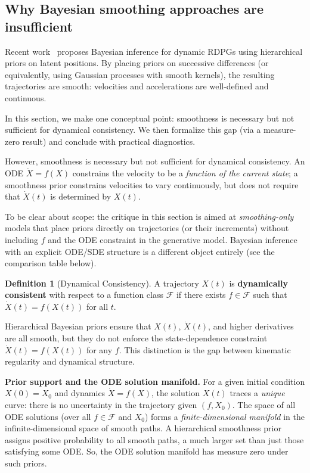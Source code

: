 \documentclass{article}
\theoremstyle{plain}
\theoremstyle{definition}
\newtheorem{definition}{Definition}
\theoremstyle{remark}
\begin{document}
\subsection{Why Bayesian smoothing approaches are insufficient}\label{sec:bayesian-smoothing}

Recent work~\citep{loyal2025} proposes Bayesian inference for dynamic RDPGs using hierarchical priors on latent positions.
By placing priors on successive differences (or equivalently, using Gaussian processes with smooth kernels), the resulting trajectories are smooth: velocities and accelerations are well-defined and continuous.

In this section, we make one conceptual point: smoothness is necessary but not sufficient for dynamical consistency. We then formalize this gap (via a measure-zero result) and conclude with practical diagnostics.

However, smoothness is necessary but not sufficient for dynamical consistency.
An ODE $\dot{X} = f(X)$ constrains the velocity to be a \emph{function of the current state}; a smoothness prior constrains velocities to vary continuously, but does not require that $\dot{X}(t)$ is determined by $X(t)$.

To be clear about scope: the critique in this section is aimed at \emph{smoothing-only} models that place priors directly on trajectories (or their increments) without including $f$ and the ODE constraint in the generative model. Bayesian inference with an explicit ODE/SDE structure is a different object entirely (see the comparison table below).

\begin{definition}[Dynamical Consistency]
A trajectory $X(t)$ is \textbf{dynamically consistent} with respect to a function class $\mathcal{F}$ if there exists $f \in \mathcal{F}$ such that $\dot{X}(t) = f(X(t))$ for all $t$.
\end{definition}

Hierarchical Bayesian priors ensure that $X(t)$, $\dot{X}(t)$, and higher derivatives are all smooth, but they do not enforce the state-dependence constraint $\dot{X}(t) = f(X(t))$ for any $f$.
This distinction is the gap between kinematic regularity and dynamical structure.

\textbf{Prior support and the ODE solution manifold.}
For a given initial condition $X(0) = X_0$ and dynamics $\dot{X} = f(X)$, the solution $X(t)$ traces a \emph{unique} curve: there is no uncertainty in the trajectory given $(f, X_0)$.
The space of all ODE solutions (over all $f \in \mathcal{F}$ and $X_0$) forms a \emph{finite-dimensional manifold} in the infinite-dimensional space of smooth paths.
A hierarchical smoothness prior assigns positive probability to all smooth paths, a much larger set than just those satisfying some ODE. So, the ODE solution manifold has measure zero under such priors.
\end{document}
